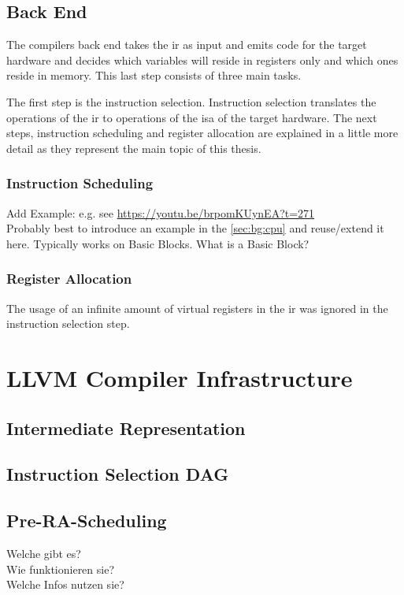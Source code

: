 \subsection{Back End}
\label{sec:bg:compilers:backend}
The compilers back end takes the \ac{ir} as input and emits code for the target hardware and decides which variables will reside in registers only and which ones reside in memory.
This last step consists of three main tasks.

The first step is the instruction selection.
Instruction selection translates the operations of the \ac{ir} to operations of the \ac{isa} of the target hardware.
The next steps, instruction scheduling and register allocation are explained in a little more detail as they represent the main topic of this thesis.

\subsubsection{Instruction Scheduling}
Add Example: e.g. see \url{https://youtu.be/brpomKUynEA?t=271} \\
Probably best to introduce an example in the \cref{sec:bg:cpu} and reuse/extend it here.
Typically works on Basic Blocks. What is a Basic Block?

\subsubsection{Register Allocation}
The usage of an infinite amount of virtual registers in the \ac{ir} was ignored in the instruction selection step.

\section{LLVM Compiler Infrastructure}
\subsection{Intermediate Representation}
\subsection{Instruction Selection DAG}
\subsection{Pre-RA-Scheduling}
Welche gibt es?\\
Wie funktionieren sie?\\
Welche Infos nutzen sie?\\

